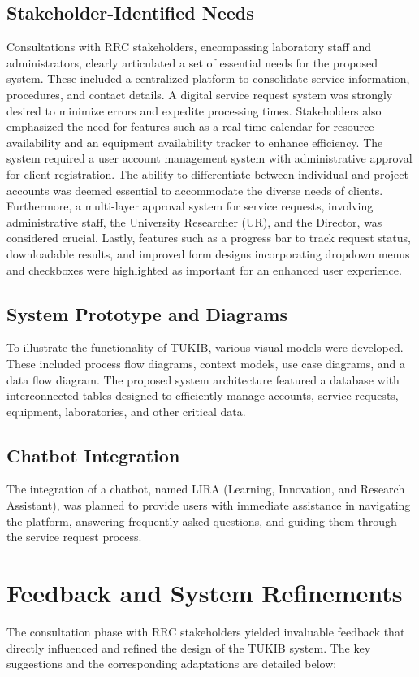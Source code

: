 \subsection{Stakeholder-Identified Needs}
Consultations with RRC stakeholders, encompassing laboratory staff and administrators, clearly articulated a set of essential needs for the proposed system. These included a centralized platform to consolidate service information, procedures, and contact details. A digital service request system was strongly desired to minimize errors and expedite processing times. Stakeholders also emphasized the need for features such as a real-time calendar for resource availability and an equipment availability tracker to enhance efficiency. The system required a user account management system with administrative approval for client registration. The ability to differentiate between individual and project accounts was deemed essential to accommodate the diverse needs of clients. Furthermore, a multi-layer approval system for service requests, involving administrative staff, the University Researcher (UR), and the Director, was considered crucial. Lastly, features such as a progress bar to track request status, downloadable results, and improved form designs incorporating dropdown menus and checkboxes were highlighted as important for an enhanced user experience.

\subsection{System Prototype and Diagrams}
To illustrate the functionality of TUKIB, various visual models were developed. These included process flow diagrams, context models, use case diagrams, and a data flow diagram. The proposed system architecture featured a database with interconnected tables designed to efficiently manage accounts, service requests, equipment, laboratories, and other critical data.

\subsection{Chatbot Integration}
The integration of a chatbot, named LIRA (Learning, Innovation, and Research Assistant), was planned to provide users with immediate assistance in navigating the platform, answering frequently asked questions, and guiding them through the service request process.

\section{Feedback and System Refinements}
The consultation phase with RRC stakeholders yielded invaluable feedback that directly influenced and refined the design of the TUKIB system. The key suggestions and the corresponding adaptations are detailed below:

